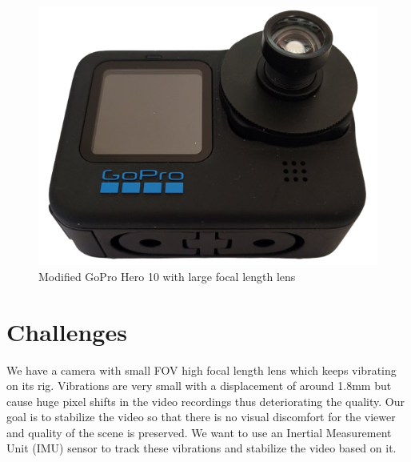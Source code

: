 \begin{figure}[H]
    \centering
    \includegraphics[scale=0.25]{images/fig_chapter4/mod_gorpro_hero_10.png}
    \caption{Modified GoPro Hero 10 with large focal length lens}
    \label{fig:mod_gopro_hero10}
\end{figure}






\section{Challenges}
We have a camera with small FOV high focal length lens which keeps vibrating on its rig. Vibrations are very small with a displacement of around 1.8mm but cause huge pixel shifts in the video recordings thus deteriorating the quality. Our goal is to stabilize the video so that there is no visual discomfort for the viewer and quality of the scene is preserved. We want to use an Inertial Measurement Unit (IMU) sensor to track these vibrations and stabilize the video based on it.

